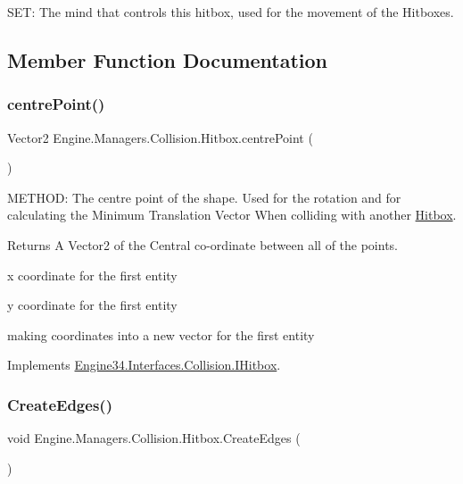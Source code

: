 S\+ET\+: The mind that controls this hitbox, used for the movement of the Hitboxes. 

\subsection{Member Function Documentation}
\mbox{\label{a00506_ad129f58518e4fedffc47433af729b3bf}} 
\subsubsection{\texorpdfstring{centre\+Point()}{centrePoint()}}
{\footnotesize\ttfamily Vector2 Engine.\+Managers.\+Collision.\+Hitbox.\+centre\+Point (\begin{DoxyParamCaption}{ }\end{DoxyParamCaption})\hspace{0.3cm}{\ttfamily [inline]}}



M\+E\+T\+H\+OD\+: The centre point of the shape. Used for the rotation and for calculating the Minimum Translation Vector When colliding with another \hyperlink{a00506}{Hitbox}. 

\begin{DoxyReturn}{Returns}
A Vector2 of the Central co-\/ordinate between all of the points.
\end{DoxyReturn}
x coordinate for the first entity

y coordinate for the first entity

making coordinates into a new vector for the first entity 

Implements \hyperlink{a00434_a5028f79a4e2537e578c528c932dee948}{Engine34.\+Interfaces.\+Collision.\+I\+Hitbox}.

\mbox{\label{a00506_a6bc6facadaf82a8c49979e35f0c8b132}} 
\subsubsection{\texorpdfstring{Create\+Edges()}{CreateEdges()}}
{\footnotesize\ttfamily void Engine.\+Managers.\+Collision.\+Hitbox.\+Create\+Edges (\begin{DoxyParamCaption}{ }\end{DoxyParamCaption})\hspace{0.3cm}{\ttfamily [inline]}}



